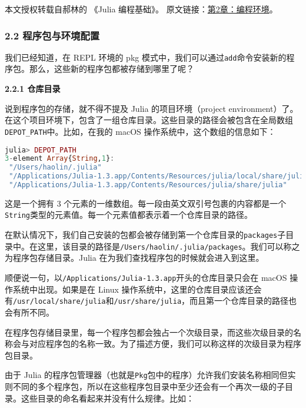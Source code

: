 
本文授权转载自郝林的 《Julia 编程基础》。 原文链接：\href{https://github.com/hyper0x/JuliaBasics/blob/master/book/ch02.md}{第2章：编程环境}。


\subsubsection{2.2 程序包与环境配置}

我们已经知道，在 REPL 环境的 pkg 模式中，我们可以通过\verb`add`命令安装新的程序包。那么，这些新的程序包都被存储到哪里了呢？

\textbf{2.2.1 仓库目录}

说到程序包的存储，就不得不提及 Julia 的项目环境（project environment）了。在这个项目环境下，包含了一组仓库目录。这些目录的路径会被包含在全局数组\verb`DEPOT_PATH`中。比如，在我的 macOS 操作系统中，这个数组的信息如下：

\begin{lstlisting}[language=julia]
julia> DEPOT_PATH
3-element Array{String,1}:
 "/Users/haolin/.julia"                                                  
 "/Applications/Julia-1.3.app/Contents/Resources/julia/local/share/julia"
 "/Applications/Julia-1.3.app/Contents/Resources/julia/share/julia" 
\end{lstlisting}

这是一个拥有 3 个元素的一维数组。每一段由英文双引号包裹的内容都是一个\verb`String`类型的元素值。每一个元素值都表示着一个仓库目录的路径。

在默认情况下，我们自己安装的包都会被存储到第一个仓库目录的\verb`packages`子目录中。在这里，该目录的路径是\verb`/Users/haolin/.julia/packages`。我们可以称之为程序包存储目录。Julia 在为我们查找程序包的时候就会进入到这里。

顺便说一句，以\verb`/Applications/Julia-1.3.app`开头的仓库目录只会在 macOS 操作系统中出现。如果是在 Linux 操作系统中，这里的仓库目录应该还会有\verb`/usr/local/share/julia`和\verb`/usr/share/julia`，而且第一个仓库目录的路径也会有所不同。

在程序包存储目录里，每一个程序包都会独占一个次级目录，而这些次级目录的名称会与对应程序包的名称一致。为了描述方便，我们可以称这样的次级目录为程序包目录。

由于 Julia 的程序包管理器（也就是\verb`Pkg`包中的程序）允许我们安装名称相同但实则不同的多个程序包，所以在这些程序包目录中至少还会有一个再次一级的子目录。这些目录的命名看起来并没有什么规律。比如：

